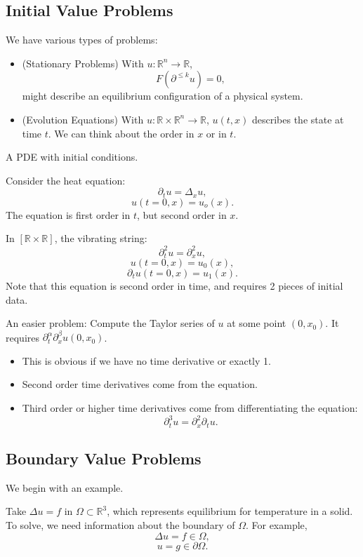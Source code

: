 \documentclass[12pt]{scrartcl}
\newcommand{\R}{\mathbb{R}}
\begin{document}
\subsection{Initial Value Problems}
We have various types of problems:
\begin{itemize}
\item (Stationary Problems) With $u : \R^n \rightarrow \R$,$$F(\partial^{\le k} u) = 0,$$ might describe an equilibrium configuration of a physical system.
\item (Evolution Equations) With $u : \R\times \R^n\rightarrow \R$, $u(t, x)$ describes the state at time $t$.  We can think about the order in $x$ or in $t$. 
\end{itemize}
\begin{definition} A PDE with initial conditions.
\end{definition}
\begin{example} Consider the heat equation:
$$\partial_t u = \Delta_x u,$$
$$ u(t = 0, x) = u_o(x).$$
The equation is first order in $t$, but second order in $x$.
\end{example} 
\begin{example}
In $[\R \times \R]$, the vibrating string:
$$\partial_t^2 u = \partial_x^2 u,$$
$$u(t=0, x) = u_0(x),$$
$$\partial_t u(t=0, x) = u_1(x).$$
Note that this equation is second order in time, and requires 2 pieces of initial data.

An easier problem: Compute the Taylor series of $u$ at some point $(0, x_0)$. It requires $\partial_t^{\alpha} \partial_x^{\beta} u(0, x_0)$.  
\begin{itemize}
\item This is obvious if we have no time derivative or exactly 1.  
\item Second order time derivatives come from the equation.
\item Third order or higher time derivatives come from differentiating the equation:
$$\partial_t^3 u = \partial_x^2 \partial_t u.$$
\end{itemize}
\end{example}
\subsection{Boundary Value Problems}
We begin with an example.
\begin{example} Take $\Delta u = f$ in $\Omega \subset \R^3$, which represents equilibrium for temperature in a solid.  To solve, we need information about the boundary of $\Omega$.  For example,
$$\Delta u = f \in \Omega,$$
$$u = g \in \partial \Omega.$$
\end{example}
\end{document}
